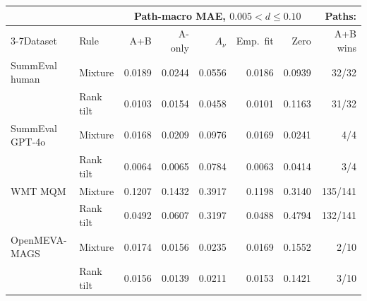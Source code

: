 \begin{tabular}{llrrrrrr}
\toprule
 &  & \multicolumn{5}{c}{Path-macro MAE, $0.005<d\le0.10$} & Paths: \\
\cmidrule(lr){3-7}Dataset & Rule & A+B & A-only & $A_\nu$ & Emp.\ fit & Zero & A+B wins \\
\midrule
SummEval human & Mixture & 0.0189 & 0.0244 & 0.0556 & 0.0186 & 0.0939 & 32/32 \\
 & Rank tilt & 0.0103 & 0.0154 & 0.0458 & 0.0101 & 0.1163 & 31/32 \\
\midrule
SummEval GPT-4o & Mixture & 0.0168 & 0.0209 & 0.0976 & 0.0169 & 0.0241 & 4/4 \\
 & Rank tilt & 0.0064 & 0.0065 & 0.0784 & 0.0063 & 0.0414 & 3/4 \\
\midrule
WMT MQM & Mixture & 0.1207 & 0.1432 & 0.3917 & 0.1198 & 0.3140 & 135/141 \\
 & Rank tilt & 0.0492 & 0.0607 & 0.3197 & 0.0488 & 0.4794 & 132/141 \\
\midrule
OpenMEVA-MAGS & Mixture & 0.0174 & 0.0156 & 0.0235 & 0.0169 & 0.1552 & 2/10 \\
 & Rank tilt & 0.0156 & 0.0139 & 0.0211 & 0.0153 & 0.1421 & 3/10 \\
\bottomrule
\end{tabular}
